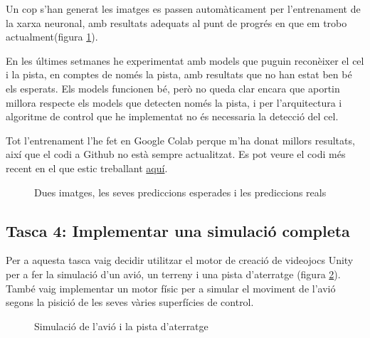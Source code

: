 \documentclass[10pt,a4paper,twocolumn,twoside]{article}
\begin{document}
Un cop s'han generat les imatges es passen automàticament per l'entrenament de la xarxa neuronal, amb resultats adequats al punt de progrés en que
em trobo actualment(figura \ref{fig-pred-exmpl}).

En les últimes setmanes he experimentat amb models que puguin reconèixer el cel i la pista, en comptes de només la pista, amb resultats que
no han estat ben bé els esperats. Els models funcionen bé, però no queda clar encara que aportin millora respecte els models que detecten
només la pista, i per l'arquitectura i algoritme de control que he implementat no és necessaria la detecció del cel.

Tot l'entrenament l'he fet en Google Colab perque m'ha donat millors resultats, així que el codi a Github no està sempre actualitzat.
Es pot veure el codi més recent en el que estic treballant \href{https://colab.research.google.com/drive/1fX-1lhTc6W_ACkCkY24vqCnT4GJXCWct?usp=sharing}{aquí}.

\begin{figure}[h]
\centering
{}
    \caption{Dues imatges, les seves prediccions esperades i les prediccions reals}
    \label{fig-pred-exmpl}
\end{figure}

\subsection{Tasca 4: Implementar una simulació completa}
Per a aquesta tasca vaig decidir utilitzar el motor de creació de videojocs Unity per a fer la simulació d'un avió, un terreny i una pista
d'aterratge (figura \ref{fig-simulador}). També vaig implementar un motor físic per a simular el moviment de l'avió segons la pisició de les seves
vàries superfícies de control.
\begin{figure}[h]
\centering
{}
    \caption{Simulació de l'avió i la pista d'aterratge}
    \label{fig-simulador}
\end{figure}
\end{document}
